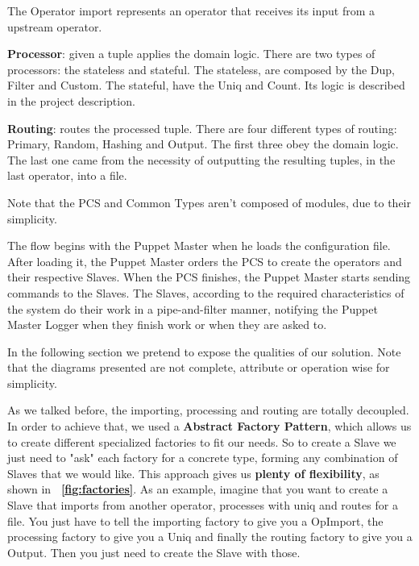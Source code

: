 \documentclass[times, 10pt,twocolumn]{article}
\begin{document}
The Operator import represents an operator that receives its input from a upstream operator.

\textbf{Processor}: given a tuple applies the domain logic. There are two types of processors: the stateless and stateful. The stateless, are composed by the Dup, Filter and Custom. The stateful, have the Uniq and Count. Its logic is described in the project description.

\textbf{Routing}: routes the processed tuple. There are four different types of routing: Primary, Random, Hashing and Output. The first three obey the domain logic. The last one came from the necessity of outputting the resulting tuples, in the last operator, into a file. 

Note that the PCS and Common Types aren't composed of modules, due to their simplicity.



The flow begins with the Puppet Master when he loads the configuration file. After loading it, the Puppet Master orders the PCS to create the operators and their respective Slaves. When the PCS finishes, the Puppet Master starts sending commands to the Slaves. The Slaves, according to the required characteristics of the system do their work in a pipe-and-filter manner, notifying the Puppet Master Logger when they finish work or when they are asked to.



In the following section we pretend to expose the qualities of our solution. Note that the diagrams presented are not complete, attribute or operation wise for simplicity.

As we talked before, the importing, processing and routing are totally decoupled. In order to achieve that, we used a \textbf{Abstract Factory Pattern}, which allows us to create different specialized factories to fit our needs. So to create a Slave we just need to "ask" each factory for a concrete type, forming any combination of Slaves that we would like. This approach gives us \textbf{plenty of flexibility}, as shown in \textbf{~\cref{fig:factories}}. As an example, imagine that you want to create a Slave that imports from another operator, processes with uniq and routes for a file. You just have to tell the importing factory to give you a OpImport, the processing factory to give you a Uniq and finally the routing factory to give you a Output. Then you just need to create the Slave with those.
\end{document}

